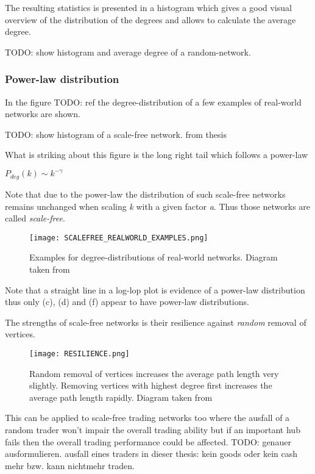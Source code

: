 \documentclass[../Bachelorarbeit.tex]{subfiles}
\begin{document}
The resulting statistics is presented in a histogram which gives a good visual overview of the distribution of the degrees and allows to calculate the average degree. 

TODO: show histogram and average degree of a random-network.

\subsubsection{Power-law distribution}
In the figure TODO: ref the degree-distribution of a few examples of real-world networks are shown.

TODO: show histogram of a scale-free network. from thesis

What is striking about this figure is the long right tail which follows a power-law 

\begin{center}
$P_{deg}(k) \sim k^{-\gamma}$
\end{center}

Note that due to the power-law the distribution of such scale-free networks remains unchanged when scaling \textit{k} with a given factor \textit{a}. Thus those networks are called \textit{scale-free}.

\begin{figure}[H]
	\centering
  \texttt{[image: SCALEFREE\_REALWORLD\_EXAMPLES.png]}
  	\caption{Examples for degree-distributions of real-world networks. Diagram taken from \cite{Newman_ComplexNetworks} }
	\label{fig:SCALEFREE_REALWORLD_EXAMPLES}
\end{figure}

Note that a straight line in a log-lop plot is evidence of a power-law distribution thus only (c), (d) and (f) appear to have power-law distributions.

\medskip
The strengths of scale-free networks is their resilience against \textit{random} removal of vertices.

\begin{figure}[H]
	\centering
  \texttt{[image: RESILIENCE.png]}
  	\caption{Random removal of vertices increases the average path length very slightly. Removing vertices with highest degree first increases the average path length rapidly. Diagram taken from \cite{Newman_ComplexNetworks} }
	\label{fig:RESILIENCE}
\end{figure}

This can be applied to scale-free trading networks too where the ausfall of a random trader won't impair the overall trading ability but if an important hub fails then the overall trading performance could be affected. TODO: genauer ausformulieren. ausfall eines traders in dieser thesis: kein goods oder kein cash mehr bzw. kann nichtmehr traden.
\end{document}
